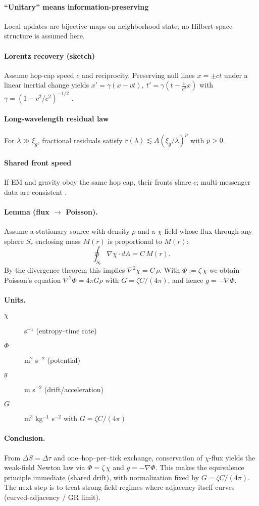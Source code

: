 \paragraph{``Unitary'' means information-preserving}
Local updates are bijective maps on neighborhood state; no Hilbert-space structure is assumed here.
\paragraph{Lorentz recovery (sketch)}
Assume hop-cap speed \(c\) and reciprocity. Preserving null lines \(x=\pm ct\) under a linear inertial change yields
\(x'=\gamma(x-vt),\ t'=\gamma(t-\frac{v}{c^2}x)\) with \(\gamma=(1-v^2/c^2)^{-1/2}\) \cite{einstein1905}.
\paragraph{Long-wavelength residual law}
For \(\lambda\gg\xi_g\), fractional residuals satisfy \(r(\lambda)\lesssim A(\xi_g/\lambda)^p\) with \(p>0\).
\paragraph{Shared front speed}
If EM and gravity obey the same hop cap, their fronts share \(c\); multi-messenger data are consistent \cite{abbott2017gw170817}.


\paragraph{Lemma (flux $\to$ Poisson).}
Assume a stationary source with density $\rho$ and a $\chi$-field whose flux through any sphere $S_r$ enclosing mass $M(r)$ is proportional to $M(r)$:
\[\oint_{S_r} \nabla\chi\cdot dA = C\,M(r).\]
By the divergence theorem this implies $\nabla^2\chi = C\,\rho$. With $\Phi:=\zeta\,\chi$ we obtain Poisson's equation $\nabla^2\Phi=4\pi G\rho$ with $G=\zeta C/(4\pi)$, and hence $g=-\nabla\Phi$.

\paragraph{Units.}
\begin{description}
\item[$\chi$] s$^{-1}$ (entropy--time rate)
\item[$\Phi$] m$^2$ s$^{-2}$ (potential)
\item[$g$] m s$^{-2}$ (drift/acceleration)
\item[$G$] m$^3$ kg$^{-1}$ s$^{-2}$ with $G=\zeta C/(4\pi)$
\end{description}

\paragraph{Conclusion.}
From $\Delta S=\Delta\tau$ and one--hop--per--tick exchange, conservation of $\chi$-flux yields the weak-field Newton law via $\Phi=\zeta\,\chi$ and $g=-\nabla\Phi$. This makes the equivalence principle immediate (shared drift), with normalization fixed by $G=\zeta C/(4\pi)$. The next step is to treat strong-field regimes where adjacency itself curves (curved-adjacency / GR limit).